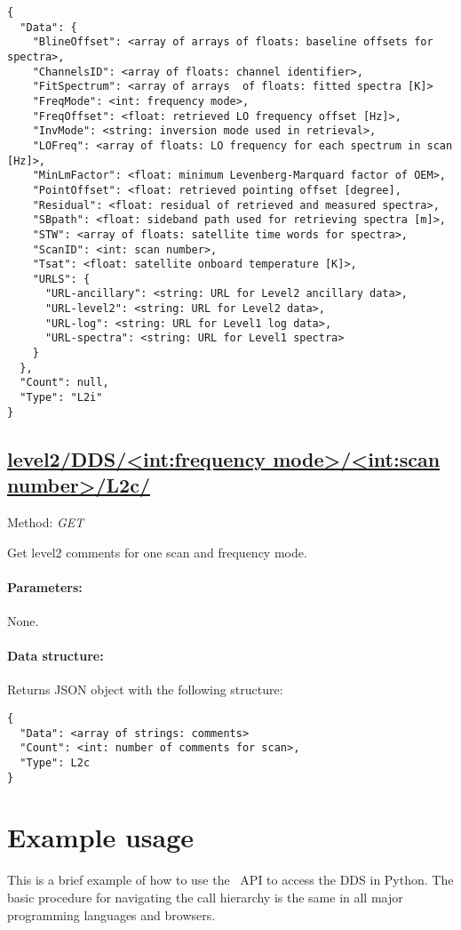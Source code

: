 \begin{lstlisting}[basicstyle=\footnotesize]
{
  "Data": {
    "BlineOffset": <array of arrays of floats: baseline offsets for spectra>,
    "ChannelsID": <array of floats: channel identifier>,
    "FitSpectrum": <array of arrays	 of floats: fitted spectra [K]>
    "FreqMode": <int: frequency mode>,
    "FreqOffset": <float: retrieved LO frequency offset [Hz]>,
    "InvMode": <string: inversion mode used in retrieval>,
    "LOFreq": <array of floats: LO frequency for each spectrum in scan [Hz]>,
    "MinLmFactor": <float: minimum Levenberg-Marquard factor of OEM>,
    "PointOffset": <float: retrieved pointing offset [degree],
    "Residual": <float: residual of retrieved and measured spectra>,
    "SBpath": <float: sideband path used for retrieving spectra [m]>,
    "STW": <array of floats: satellite time words for spectra>,
    "ScanID": <int: scan number>,
    "Tsat": <float: satellite onboard temperature [K]>,
    "URLS": {
      "URL-ancillary": <string: URL for Level2 ancillary data>,
      "URL-level2": <string: URL for Level2 data>,
      "URL-log": <string: URL for Level1 log data>,
      "URL-spectra": <string: URL for Level1 spectra>
    }
  },
  "Count": null,
  "Type": "L2i"
}
\end{lstlisting}


\subsection{\url{level2/DDS/<int:frequency mode>/<int:scan number>/L2c/}}
Method: \emph{GET}

Get level2 comments for one scan and frequency mode.

\paragraph{Parameters:} None.

\paragraph{Data structure:}
Returns JSON object with the following structure:

\begin{lstlisting}[basicstyle=\footnotesize]
{
  "Data": <array of strings: comments>
  "Count": <int: number of comments for scan>,
  "Type": L2c
}
\end{lstlisting}


\section{Example usage}
\label{sec:api_usage}
This is a brief example of how to use the \smr~API to access the DDS in Python.
The basic procedure for navigating the call hierarchy is the same in all major
programming languages and browsers.


